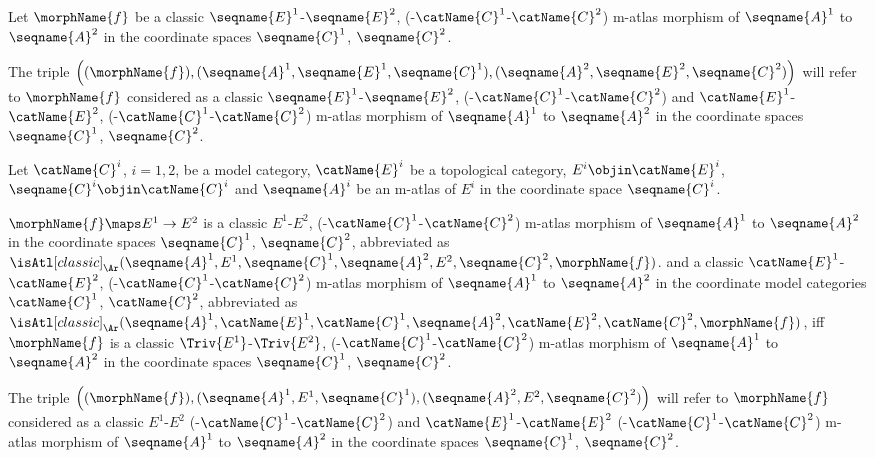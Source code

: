 \documentclass{article}
\begin{document}
\begin{definition}
Let $\morphName{f}$ be a classic
\nobreaks
  {
    {$\seqname{E}^1$-$\seqname{E}^2$},
    {(-$\catName{C}^1$-$\catName{C}^2$)}
  }
m-atlas morphism of $\seqname{A}^1$ to $\seqname{A}^2$ in the
coordinate spaces $\seqname{C}^1$, $\seqname{C}^2$.

The triple
$
  \Bigl (
    (\morphName{f}),
    (\seqname{A}^1, \seqname{E}^1, \seqname{C}^1),
    (\seqname{A}^2, \seqname{E}^2, \seqname{C}^2)
  \Bigr )
$
will refer to $\morphName{f}$ considered as a classic
\nobreaks
  {
    {$\seqname{E}^1$-$\seqname{E}^2$},
    {(-$\catName{C}^1$-$\catName{C}^2$)}
  }
and
\nobreaks
  {
    {$\catName{E}^1$-$\catName{E}^2$},
    {(-$\catName{C}^1$-$\catName{C}^2$)}
  }
m-atlas morphism of $\seqname{A}^1$ to $\seqname{A}^2$ in the coordinate
spaces $\seqname{C}^1$, $\seqname{C}^2$.
\end{definition}

\begin{definition}
\label{def:M-ATLcmorphtop}
Let $\catName{C}^i$, $i=1,2$, be a model category, $\catName{E}^i$ be a
topological category, $E^i \objin \catName{E}^i$,
$\seqname{C}^i \objin \catName{C}^i$ and $\seqname{A}^i$ be an m-atlas
of $E^i$ in the coordinate space $\seqname{C}^i$.

$\morphName{f} \maps E^1 \to E^2$ is a classic
\nobreaks
  {
    {$E^1$-$E^2$},
    {(-$\catName{C}^1$-$\catName{C}^2$)}
  }
m-atlas morphism of $\seqname{A}^1$ to $\seqname{A}^2$ in the coordinate
spaces $\seqname{C}^1$, $\seqname{C}^2$, abbreviated as
$
  \isAtl[classic]_\Ar
  (
    \seqname{A}^1,
    E^1,
    \seqname{C}^1,
    \seqname{A}^2,
    E^2,
    \seqname{C}^2,
    \morphName{f}
  )
$.
and a classic
\nobreaks
  {
    {$\catName{E}^1$-$\catName{E}^2$},
    {(-$\catName{C}^1$-$\catName{C}^2$)}
  }
m-atlas morphism of $\seqname{A}^1$ to $\seqname{A}^2$ in the coordinate
model categories $\catName{C}^1$, $\catName{C}^2$, abbreviated as
$
  \isAtl[classic]_\Ar
  (
    \seqname{A}^1,
    \catName{E}^1,
    \catName{C}^1,
    \seqname{A}^2,
    \catName{E}^2,
    \catName{C}^2,
    \morphName{f}
  )
$,
iff $\morphName{f}$ is a classic
\nobreaks
  {
    {$\Triv{E^1}$-$\Triv{E^2}$},
    {(-$\catName{C}^1$-$\catName{C}^2$)}
  }
m-atlas
morphism of $\seqname{A}^1$ to $\seqname{A}^2$ in the coordinate spaces
$\seqname{C}^1$, $\seqname{C}^2$.

The triple
$
  \Bigl (
    (\morphName{f}),
    (\seqname{A}^1, E^1, \seqname{C}^1),
    (\seqname{A}^2, E^2, \seqname{C}^2)
  \Bigr )
$
will refer to $\morphName{f}$ considered as a classic
\nobreaks
  {
    {$E^1$-$E^2$}%
    {(-$\catName{C}^1$-$\catName{C}^2$)}
  }
and
\nobreaks
  {
    {$\catName{E}^1$-$\catName{E}^2$}%
    {(-$\catName{C}^1$-$\catName{C}^2$)}
  }
m-atlas morphism of $\seqname{A}^1$ to $\seqname{A}^2$ in the coordinate
spaces $\seqname{C}^1$, $\seqname{C}^2$.
\end{definition}
\end{document}
